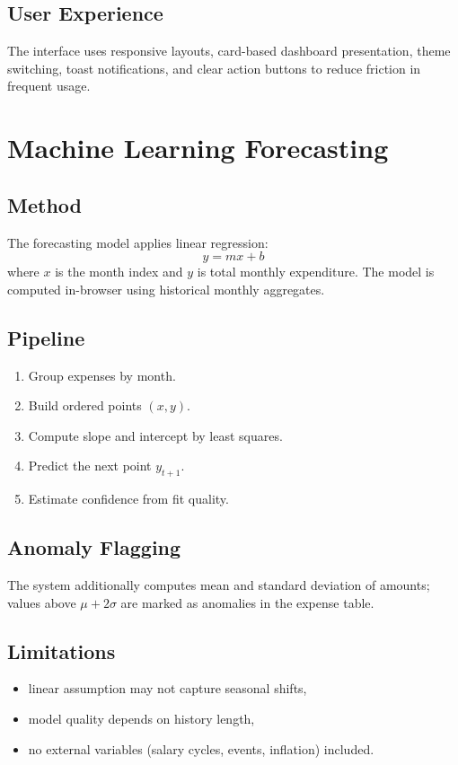 \documentclass[conference]{IEEEtran}
\begin{document}
\subsection{User Experience}
The interface uses responsive layouts, card-based dashboard presentation, theme switching, toast notifications, and clear action buttons to reduce friction in frequent usage.

\section{Machine Learning Forecasting}
\subsection{Method}
The forecasting model applies linear regression:
\[
y = mx + b
\]
where \(x\) is the month index and \(y\) is total monthly expenditure. The model is computed in-browser using historical monthly aggregates.

\subsection{Pipeline}
\begin{enumerate}
    \item Group expenses by month.
    \item Build ordered points \((x, y)\).
    \item Compute slope and intercept by least squares.
    \item Predict the next point \(y_{t+1}\).
    \item Estimate confidence from fit quality.
\end{enumerate}

\subsection{Anomaly Flagging}
The system additionally computes mean and standard deviation of amounts; values above \(\mu + 2\sigma\) are marked as anomalies in the expense table.

\subsection{Limitations}
\begin{itemize}
    \item linear assumption may not capture seasonal shifts,
    \item model quality depends on history length,
    \item no external variables (salary cycles, events, inflation) included.
\end{itemize}
\end{document}

